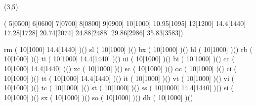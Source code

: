 %
%
%
%
%
%
%

\lhvercheck(3,5)


     \tablevalues     ( 5[0500] 6[0600] 7[0700] 8[0800] 9[0900]
                          10[1000] 10.95[1095] 12[1200] 14.4[1440]
                          17.28[1728] 20.74[2074] 24.88[2488]
                          29.86[2986] 35.83[3583])

     \makefont\fonttwoletters rm   %
                          ( 10[1000] 14.4[1440] )()
     \makefont\fonttwoletters sl   %
                          ( 10[1000] )()
     \makefont\fonttwoletters bx   %
                          ( 10[1000] )()
     \makefont\fonttwoletters bl   %
                          ( 10[1000] )()
     \makefont\fonttwoletters rb   %
                          ( 10[1000] )()
     \makefont\fonttwoletters ti   %
                          ( 10[1000] 14.4[1440] )()
     \makefont\fonttwoletters ui   %
                          ( 10[1000] )()
     \makefont\fonttwoletters bi   %
                          ( 10[1000] )()
     \makefont\fonttwoletters cc   %
                          ( 10[1000] 14.4[1440] )()
     \makefont\fonttwoletters xc   %
                          ( 10[1000] )()
     \makefont\fonttwoletters sc   %
                          ( 10[1000] )()
     \makefont\fonttwoletters oc    %
                          ( 10[1000] )()
     \makefont\fonttwoletters ci    %
                          ( 10[1000] )()
     \makefont\fonttwoletters tt   %
                          ( 10[1000] 14.4[1440] )()
     \makefont\fonttwoletters it   %
                          ( 10[1000] )()
     \makefont\fonttwoletters vt   %
                          ( 10[1000] )()
     \makefont\fonttwoletters vi   %
                          ( 10[1000] )()
     \makefont\fonttwoletters tc   %
                          ( 10[1000] )()
     \makefont\fonttwoletters st   %
                          ( 10[1000] )()
     \makefont\fonttwoletters ss   %
                          ( 10[1000] 14.4[1440] )()
     \makefont\fonttwoletters si   %
                          ( 10[1000] )()
     \makefont\fonttwoletters sx   %
                          ( 10[1000] )()
     \makefont\fonttwoletters so   %
                          ( 10[1000] )()
     \makefont\fonttwoletters dh   %
                          ( 10[1000] )()
